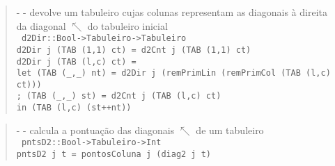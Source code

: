 \documentclass[a4paper,titlepage]{scrreprt}
\begin{document}
			\begin{quote}
				{\small - - devolve um tabuleiro cujas colunas representam as diagonais à direita da diagonal $\nwarrow$ do tabuleiro inicial\\}
				{\tt
				d2Dir::Bool->Tabuleiro->Tabuleiro\\
				d2Dir j (TAB (1,1) ct) = d2Cnt j (TAB (1,1) ct)\\
				d2Dir j (TAB (l,c) ct) =\\
				{\small let (TAB (\_,\_) nt) = d2Dir j (remPrimLin (remPrimCol (TAB (l,c) ct)))}\\
				;	(TAB (\_,\_) st) = d2Cnt j (TAB (l,c) ct)\\
				in	(TAB (l,c) (st++nt))
				}
			\end{quote}
			\begin{quote}
				{\small - - calcula a pontuação das diagonais $\nwarrow$ de um tabuleiro\\}
				{\tt
				pntsD2::Bool->Tabuleiro->Int\\
				pntsD2 j t = pontosColuna j (diag2 j t)
				}
			\end{quote}
\end{document}
